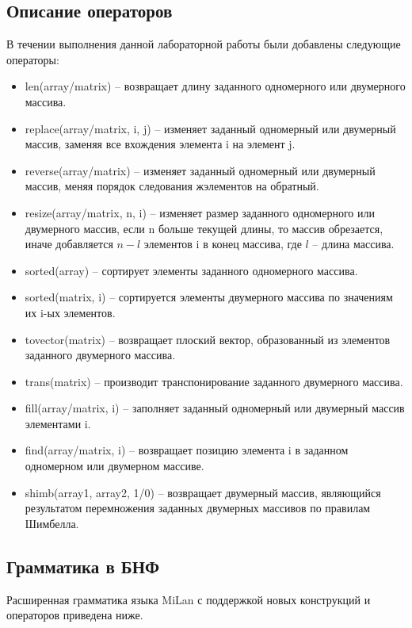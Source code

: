 \documentclass[a4paper,final]{article}
\begin{document}
\subsection{Описание операторов}
В течении выполнения данной лабораторной работы были добавлены следующие операторы:
\begin{itemize}
    \item len(array/matrix) -- возвращает длину заданного одномерного или двумерного массива.
    \item replace(array/matrix, i, j) -- изменяет заданный одномерный или двумерный массив, заменяя все вхождения элемента i на элемент j.
    \item reverse(array/matrix) -- изменяет заданный одномерный или двумерный массив, меняя порядок следования жэлементов на обратный.
    \item resize(array/matrix, n, i) -- изменяет размер заданного одномерного или двумерного массив, если n больше текущей длины, то массив обрезается, иначе добавляется $n - l$ элементов i в конец массива, где $l$ -- длина массива.
    \item sorted(array) -- сортирует элементы заданного одномерного массива.
    \item sorted(matrix, i) -- сортируется элементы двумерного массива по значениям их i-ых элементов.
    \item tovector(matrix) -- возвращает плоский вектор, образованный из элементов заданного двумерного массива.
    \item trans(matrix) -- производит транспонирование заданного двумерного массива.
    \item fill(array/matrix, i) -- заполняет заданный одномерный или двумерный массив элементами i.
    \item find(array/matrix, i) -- возвращает позицию элемента i в заданном одномерном или двумерном массиве.
    \item shimb(array1, array2, 1/0) -- возвращает двумерный массив, являющийся результатом перемножения заданных двумерных массивов по правилам Шимбелла.    
\end{itemize}

\subsection{Грамматика в БНФ}
Расширенная грамматика языка MiLan с поддержкой новых конструкций и операторов приведена ниже.
\end{document}
